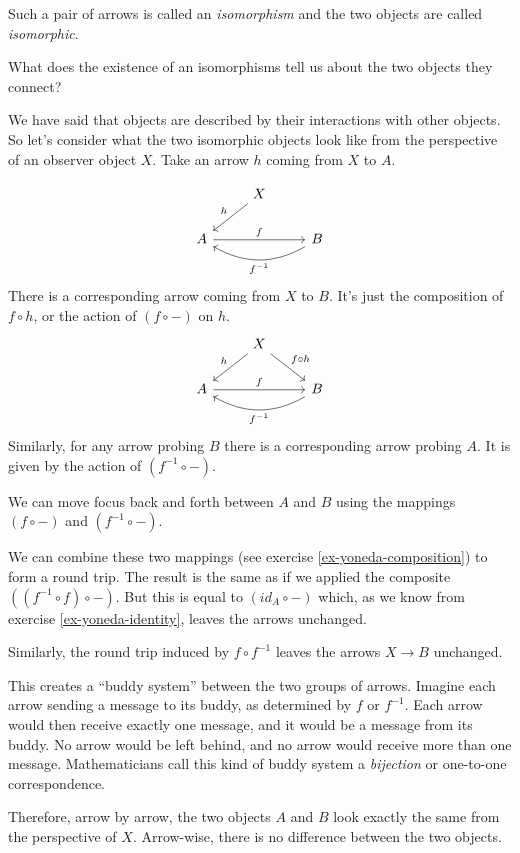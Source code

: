 \documentclass[DaoFP]{subfiles}
\begin{document}
Such a pair of arrows is called an \emph{isomorphism} and the two objects are called \emph{isomorphic}.

What does the existence of an isomorphisms tell us about the two objects they connect? 

We have said that objects are described by their interactions with other objects. So let's consider what the two isomorphic objects look like from the perspective of an observer object $X$. Take an arrow $h$ coming from $X$ to $A$.

\[
 \begin{tikzcd}
 & X
 \arrow[ld, "h"']
 \\
 A
 \arrow[rr, "f"]
  && B
 \arrow[ll, bend left,  "f^{-1}"]
 \end{tikzcd}
\]
There is a corresponding arrow coming from $X$ to $B$. It's just the composition of $f \circ h$, or the action of $(f \circ -)$ on $h$.
\[
 \begin{tikzcd}
 & X
 \arrow[ld, "h"']
 \arrow[rd, "f \circ h"]
 \\
 A
 \arrow[rr, "f"]
  && B
 \arrow[ll, bend left,  "f^{-1}"]
 \end{tikzcd}
\]
Similarly, for any arrow probing $B$ there is a corresponding arrow probing $A$. It is given by the action of  $(f^{-1} \circ -)$. 

We can move focus back and forth between $A$ and $B$ using the mappings $(f \circ -)$ and $(f^{-1} \circ -)$.

We can combine these two mappings (see exercise \ref{ex-yoneda-composition}) to form a round trip. The result is the same as if we applied the composite $((f^{-1} \circ f) \circ -)$. But this is equal to $(id_A \circ  -)$ which, as we know from exercise \ref{ex-yoneda-identity}, leaves the arrows unchanged.

Similarly, the round trip induced by $f \circ f^{-1}$ leaves the arrows $X \to B$ unchanged. 

This creates a ``buddy system'' between the two groups of arrows. Imagine each arrow sending a message to its buddy, as determined by $f$ or $f^{-1}$. Each arrow would then receive exactly one message, and it would be a message from its buddy. No arrow would be left behind, and no arrow would receive more than one message. Mathematicians call this kind of buddy system a \emph{bijection} or one-to-one correspondence.

Therefore, arrow by arrow, the two objects $A$ and $B$ look exactly the same from the perspective of $X$. Arrow-wise, there is no difference between the two objects. 
\end{document}
